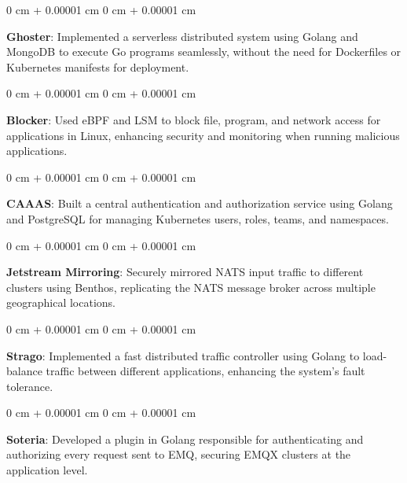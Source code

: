 \documentclass[10pt, letterpaper]{article}
\newenvironment{onecolentry}{
    \begin{adjustwidth}{
        0 cm + 0.00001 cm
    }{
        0 cm + 0.00001 cm
    }
}{
    \end{adjustwidth}
} %
\begin{document}
        \vspace{0.1 cm}
        \begin{onecolentry}
            \noindent\justifying
            \textbf{Ghoster}: Implemented a serverless distributed system using Golang and MongoDB to execute Go programs seamlessly, without the need for Dockerfiles or Kubernetes manifests for deployment.
        \end{onecolentry}
        \vspace{0.1 cm}
        \begin{onecolentry}
            \noindent\justifying
            \textbf{Blocker}: Used eBPF and LSM to block file, program, and network access for applications in Linux, enhancing security and monitoring when running malicious applications.
        \end{onecolentry}
        \vspace{0.1 cm}
        \begin{onecolentry}
            \noindent\justifying
            \textbf{CAAAS}: Built a central authentication and authorization service using Golang and PostgreSQL for managing Kubernetes users, roles, teams, and namespaces.
        \end{onecolentry}
        \vspace{0.1 cm}
        \begin{onecolentry}
            \noindent\justifying
            \textbf{Jetstream Mirroring}: Securely mirrored NATS input traffic to different clusters using Benthos, replicating the NATS message broker across multiple geographical locations.
        \end{onecolentry}
        \vspace{0.1 cm}
        \begin{onecolentry}
            \noindent\justifying
            \textbf{Strago}: Implemented a fast distributed traffic controller using Golang to load-balance traffic between different applications, enhancing the system's fault tolerance.
        \end{onecolentry}
        \vspace{0.1 cm}
        \begin{onecolentry}
            \noindent\justifying
            \textbf{Soteria}: Developed a plugin in Golang responsible for authenticating and authorizing every request sent to EMQ, securing EMQX clusters at the application level.
        \end{onecolentry}
\end{document}
